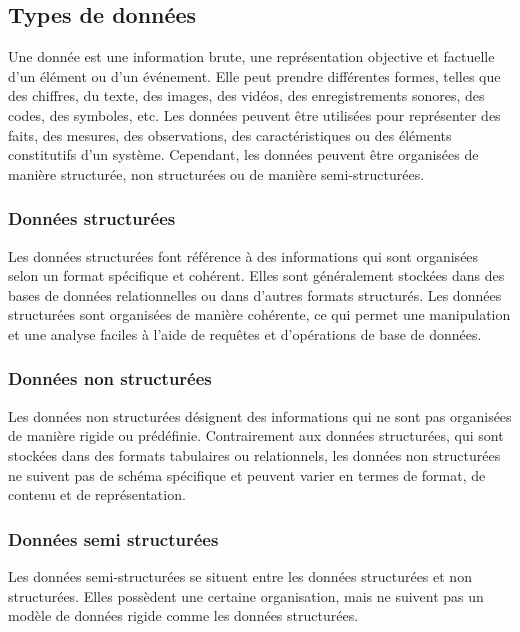 \documentclass{article}
\begin{document}
	\subsection{Types de données}
	Une donnée est une information brute, une représentation objective et factuelle d’un élément ou d’un événement. Elle peut prendre différentes formes, telles que des chiffres, du texte, des images, des vidéos, des enregistrements sonores, des codes, des symboles, etc. Les données peuvent être utilisées pour représenter des faits, des mesures, des observations, des caractéristiques ou des éléments constitutifs d’un système. Cependant, les données peuvent être organisées de manière structurée, non structurées ou de manière semi-structurées.
	
	\subsubsection{Données structurées}
	Les données structurées font référence à des informations qui sont organisées selon un format spécifique et cohérent. Elles sont généralement stockées dans des bases de données relationnelles ou dans d’autres formats structurés. Les données structurées sont organisées de manière cohérente, ce qui permet une manipulation et une analyse faciles à l’aide de requêtes et d’opérations de base de données.
	
	\subsubsection{Données non structurées}
	Les données non structurées désignent des informations qui ne sont pas organisées de manière rigide ou prédéfinie. Contrairement aux données structurées, qui sont stockées dans des formats tabulaires ou relationnels, les données non structurées ne suivent pas de schéma spécifique et peuvent varier en termes de format, de contenu et de représentation.
	
	\subsubsection{Données semi structurées}
	Les données semi-structurées se situent entre les données structurées et non structurées. Elles possèdent une certaine organisation, mais ne suivent pas un modèle de données rigide comme les données structurées.
	
\end{document}
